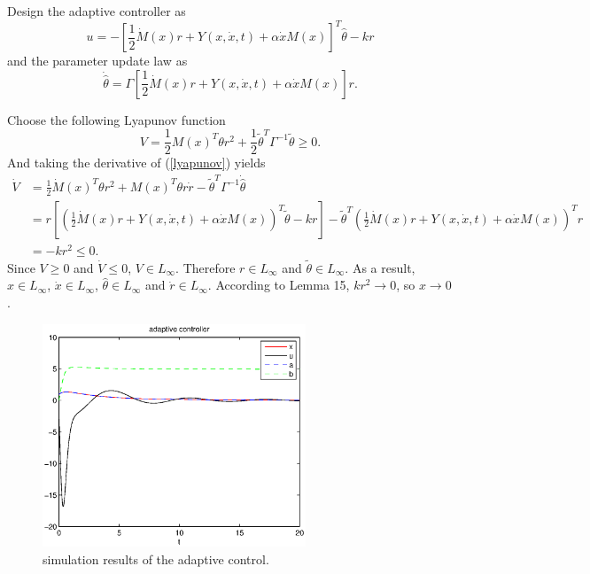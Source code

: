 \documentclass[12pt,a4paper]{article}
\begin{document}
\indent Design the adaptive controller as
\begin{equation}
u=-\left[\frac{1}{2}\dot M(x)r+Y(x,\dot{x},t)+\alpha\dot{x}M(x)\right]^T\hat\theta-kr
\label{adap_ctl}
\end{equation}
and the parameter update law as
\begin{equation}
\dot{\hat\theta}=\Gamma\left[\frac{1}{2}\dot M(x)r+Y(x,\dot{x},t)+\alpha\dot{x}M(x)\right]r.
\label{update_law}
\end{equation}

\indent Choose the following Lyapunov function
\begin{equation}
V=\frac{1}{2}M(x)^T\theta r^2+\frac{1}{2}\tilde\theta^T\Gamma^{-1}\tilde\theta\ge 0.
\label{lyapunov}
\end{equation}
And taking the derivative of (\ref{lyapunov}) yields
\begin{equation}
\begin{aligned}
\dot V &=\frac12\dot M(x)^T\theta r^2+M(x)^T\theta r\dot r-\tilde\theta^T\Gamma^{-1}\dot{\hat\theta}\\
&=r\left[\left(\frac12\dot M(x)r+Y(x,\dot x,t)+\alpha\dot x M(x)\right)^T\tilde\theta-kr\right]-\tilde\theta^T\left(\frac12\dot M(x)r+Y(x,\dot x,t)+\alpha\dot xM(x)\right)^Tr\\
&=-kr^2\le 0.
\end{aligned}
\end{equation}
Since $V\ge 0$ and $\dot V \le 0$, $V\in L_\infty$. Therefore $r\in L_\infty$ and $\tilde\theta\in L_\infty$. As a result, $x\in L_\infty$, $\dot x\in L_\infty$, $\hat\theta \in L_\infty$ and $\dot r\in L_\infty$. According to Lemma 15, $kr^2\to 0$, so $x\to 0$.

\begin{figure}
  \centering
  \includegraphics[width=0.7\textwidth]{figs/adap_controller.eps}%
  \caption{simulation results of the adaptive control.}
  \label{adap_control}
\end{figure}
\end{document}
